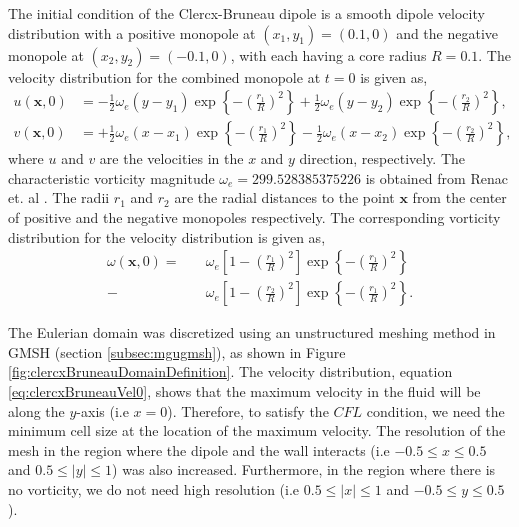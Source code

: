 The initial condition of the Clercx-Bruneau dipole is a smooth dipole velocity distribution with a positive monopole at $(x_1,y_1)=(0.1,0)$ and the negative monopole at $(x_2,y_2)=(-0.1,0)$, with each having a core radius $R = 0.1$. The velocity distribution for the combined monopole at $t=0$ is given as,
	\begin{subequations}
	\begin{align}
	u(\mathbf{x},0) & = -\frac{1}{2}\omega_e(y-y_1)\exp\left\{-\left(\frac{r_1}{R}\right)^2\right\} + \frac{1}{2}\omega_e(y-y_2)\exp\left\{-\left(\frac{r_2}{R}\right)^2\right\}, \\
	v(\mathbf{x},0) & = +\frac{1}{2}\omega_e(x-x_1)\exp\left\{-\left(\frac{r_1}{R}\right)^2\right\} - \frac{1}{2}\omega_e(x-x_2)\exp\left\{-\left(\frac{r_2}{R}\right)^2\right\},
	\end{align}
	\label{eq:clercxBruneauVel0}
	\end{subequations}
where $u$ and $v$ are the velocities in the $x$ and $y$ direction, respectively. The characteristic vorticity magnitude $\omega_e = 299.528385375226$ is obtained from Renac et. al \cite{Renac2013}. The radii $r_1$ and $r_2$ are the radial distances to the point $\mathbf{x}$ from the center of positive and the negative monopoles respectively. The corresponding vorticity distribution for the velocity distribution is given as,
	\begin{equation}
	\begin{split}
	\omega(\mathbf{x},0) = \quad &\omega_e\left[1-\left(\frac{r_1}{R}\right)^2\right]\exp\left\{-\left(\frac{r_1}{R}\right)^2\right\} \\
	-\ &\omega_e\left[1-\left(\frac{r_2}{R}\right)^2\right]\exp\left\{-\left(\frac{r_1}{R}\right)^2\right\}.
	\end{split}
	\label{eq:clercxBruneauOmega0}
	\end{equation}

The Eulerian domain was discretized using an unstructured meshing method in GMSH (section \ref{subsec:mgugmsh}), as shown in Figure \ref{fig:clercxBruneauDomainDefinition}. The velocity distribution, equation \ref{eq:clercxBruneauVel0}, shows that the maximum velocity in the fluid will be along the $y$-axis (i.e $x=0$). Therefore, to satisfy the $CFL$ condition, we need the minimum cell size at the location of the maximum velocity. The resolution of the mesh in the region where the dipole and the wall interacts (i.e $-0.5\le{x}\le0.5$ and $0.5\le{\left|y\right|}\le1$) was also increased. Furthermore, in the region where there is no vorticity, we do not need high resolution (i.e $0.5\le{\left|x\right|}\le1$ and $-0.5\le{y}\le0.5$). 

